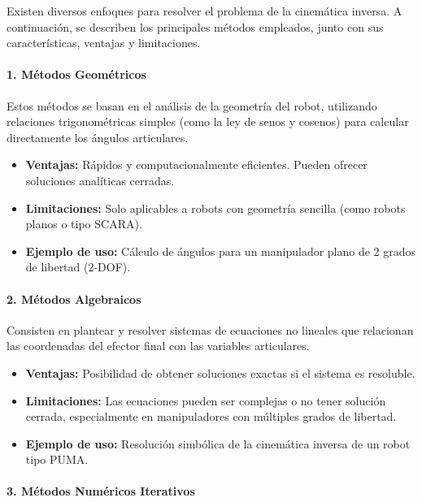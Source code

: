 Existen diversos enfoques para resolver el problema de la cinemática inversa. A continuación, se describen los principales métodos empleados, junto con sus características, ventajas y limitaciones.

\paragraph{1. Métodos Geométricos}

Estos métodos se basan en el análisis de la geometría del robot, utilizando relaciones trigonométricas simples (como la ley de senos y cosenos) para calcular directamente los ángulos articulares.

\begin{itemize}
	\item \textbf{Ventajas:} Rápidos y computacionalmente eficientes. Pueden ofrecer soluciones analíticas cerradas.
	\item \textbf{Limitaciones:} Solo aplicables a robots con geometría sencilla (como robots planos o tipo SCARA).
	\item \textbf{Ejemplo de uso:} Cálculo de ángulos para un manipulador plano de 2 grados de libertad (2-DOF).
\end{itemize}

\paragraph{2. Métodos Algebraicos}

Consisten en plantear y resolver sistemas de ecuaciones no lineales que relacionan las coordenadas del efector final con las variables articulares.

\begin{itemize}
	\item \textbf{Ventajas:} Posibilidad de obtener soluciones exactas si el sistema es resoluble.
	\item \textbf{Limitaciones:} Las ecuaciones pueden ser complejas o no tener solución cerrada, especialmente en manipuladores con múltiples grados de libertad.
	\item \textbf{Ejemplo de uso:} Resolución simbólica de la cinemática inversa de un robot tipo PUMA.
\end{itemize}

\paragraph{3. Métodos Numéricos Iterativos}

